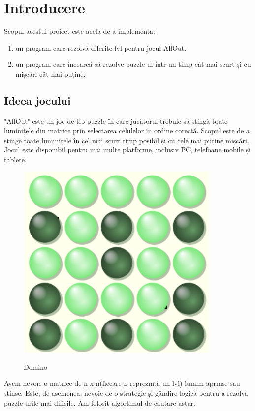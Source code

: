 \section{Introducere}

Scopul acestui proiect este acela de a implementa:
\begin{enumerate}
    \item un program care rezolvă diferite lvl pentru jocul AllOut.
    \item un program care încearcă să rezolve puzzle-ul într-un timp cât mai scurt și cu mișcări cât mai puține.
\end{enumerate} 
\newline
\subsection{Ideea jocului}

"AllOut" este un joc de tip puzzle în care jucătorul trebuie să stingă toate luminițele din matrice prin selectarea celulelor în ordine corectă. Scopul este de a stinge toate luminițele în cel mai scurt timp posibil și cu cele mai puține mișcări. Jocul este disponibil pentru mai multe platforme, inclusiv PC, telefoane mobile și tablete.
\newline
\newline
\begin{figure}[h]
    \centering
    \includegraphics[width=10cm]{text/images/pic1.png}\\
    \caption{Domino}
\end{figure}

Avem nevoie o matrice de n  x n(fiecare n reprezintă un lvl) lumini aprinse sau stinse. Este, de asemenea, nevoie de o strategie și gândire logică pentru a rezolva puzzle-urile mai dificile. Am folosit algortimul de căutare astar.
\newpage

